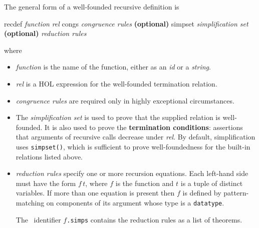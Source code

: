 The general form of a well-founded recursive definition is
\begin{ttbox}
recdef {\it function} {\it rel}
    congs   {\it congruence rules}      {\bf(optional)}
    simpset {\it simplification set}      {\bf(optional)}
   {\it reduction rules}
\end{ttbox}
where
\begin{itemize}
\item \textit{function} is the name of the function, either as an \textit{id}
  or a \textit{string}.  
  
\item \textit{rel} is a HOL expression for the well-founded termination
  relation.
  
\item \textit{congruence rules} are required only in highly exceptional
  circumstances.
  
\item The \textit{simplification set} is used to prove that the supplied
  relation is well-founded.  It is also used to prove the \textbf{termination
    conditions}: assertions that arguments of recursive calls decrease under
  \textit{rel}.  By default, simplification uses \texttt{simpset()}, which
  is sufficient to prove well-foundedness for the built-in relations listed
  above. 
  
\item \textit{reduction rules} specify one or more recursion equations.  Each
  left-hand side must have the form $f\,t$, where $f$ is the function and $t$
  is a tuple of distinct variables.  If more than one equation is present then
  $f$ is defined by pattern-matching on components of its argument whose type
  is a \texttt{datatype}.  

  The \ML\ identifier $f$\texttt{.simps} contains the reduction rules as
  a list of theorems.
\end{itemize}

